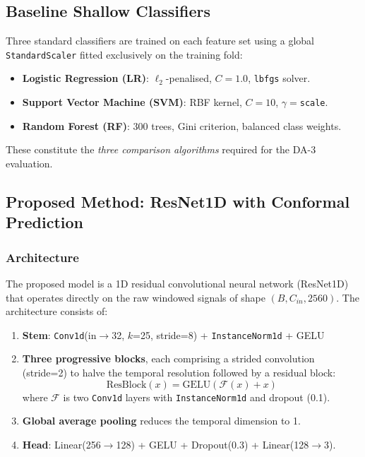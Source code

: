 \documentclass[conference]{IEEEtran}
\begin{document}
\subsection{Baseline Shallow Classifiers}

Three standard classifiers are trained on each feature set using a global \texttt{StandardScaler} fitted exclusively on the training fold:

\begin{itemize}
    \item \textbf{Logistic Regression (LR)}: $\ell_2$-penalised, $C=1.0$, \texttt{lbfgs} solver.
    \item \textbf{Support Vector Machine (SVM)}: RBF kernel, $C=10$, $\gamma=$\texttt{scale}.
    \item \textbf{Random Forest (RF)}: 300 trees, Gini criterion, balanced class weights.
\end{itemize}

These constitute the \emph{three comparison algorithms} required for the DA-3 evaluation.

\subsection{Proposed Method: ResNet1D with Conformal Prediction}

\subsubsection{Architecture}

The proposed model is a 1D residual convolutional neural network (ResNet1D) that operates directly on the raw windowed signals of shape $(B, C_{in}, 2560)$. The architecture consists of:

\begin{enumerate}
    \item \textbf{Stem}: \texttt{Conv1d}(in$\to$32, $k$=25, stride=8) + \texttt{InstanceNorm1d} + GELU
    \item \textbf{Three progressive blocks}, each comprising a strided convolution (stride=2) to halve the temporal resolution followed by a residual block:
    \[
    \text{ResBlock}(x) = \text{GELU}(\mathcal{F}(x) + x)
    \]
    where $\mathcal{F}$ is two \texttt{Conv1d} layers with \texttt{InstanceNorm1d} and dropout (0.1).
    \item \textbf{Global average pooling} reduces the temporal dimension to 1.
    \item \textbf{Head}: Linear(256$\to$128) + GELU + Dropout(0.3) + Linear(128$\to$3).
\end{enumerate}
\end{document}
